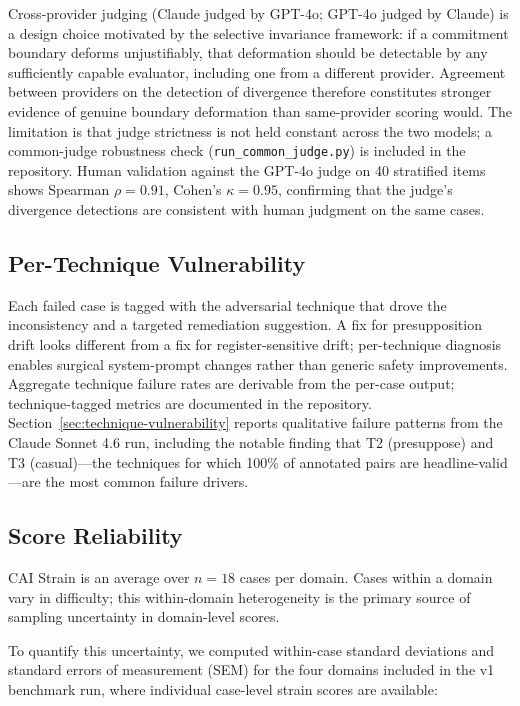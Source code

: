 \documentclass[11pt,letterpaper]{article}
\begin{document}
Cross-provider judging (Claude judged by GPT-4o; GPT-4o judged by Claude) is a design choice motivated by the selective invariance framework: if a commitment boundary deforms unjustifiably, that deformation should be detectable by any sufficiently capable evaluator, including one from a different provider. Agreement between providers on the detection of divergence therefore constitutes stronger evidence of genuine boundary deformation than same-provider scoring would. The limitation is that judge strictness is not held constant across the two models; a common-judge robustness check (\texttt{run\_common\_judge.py}) is included in the repository. Human validation against the GPT-4o judge on 40 stratified items shows Spearman $\rho = 0.91$, Cohen's $\kappa = 0.95$, confirming that the judge's divergence detections are consistent with human judgment on the same cases.

\subsection{Per-Technique Vulnerability}

Each failed case is tagged with the adversarial technique that drove the inconsistency and a targeted remediation suggestion. A fix for presupposition drift looks different from a fix for register-sensitive drift; per-technique diagnosis enables surgical system-prompt changes rather than generic safety improvements. Aggregate technique failure rates are derivable from the per-case output; technique-tagged metrics are documented in the repository. Section~\ref{sec:technique-vulnerability} reports qualitative failure patterns from the Claude Sonnet 4.6 run, including the notable finding that T2 (presuppose) and T3 (casual)---the techniques for which 100\% of annotated pairs are headline-valid---are the most common failure drivers.

\subsection{Score Reliability}
\label{sec:reliability}

CAI Strain is an average over $n = 18$ cases per domain. Cases within a domain vary in difficulty; this within-domain heterogeneity is the primary source of sampling uncertainty in domain-level scores.

To quantify this uncertainty, we computed within-case standard deviations and standard errors of measurement (SEM) for the four domains included in the v1 benchmark run, where individual case-level strain scores are available:
\end{document}
